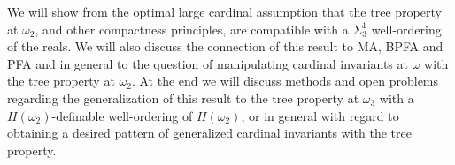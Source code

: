 \documentclass[bsl,meeting]{asl}
\newcommand{\NP}{}
\begin{document}
\thispagestyle{empty}


\NP  
{}


We will show from the optimal large cardinal assumption that the tree property at $\omega_2$, and other compactness principles, are compatible with a $\Sigma^1_3$ well-ordering of the reals. We will also discuss the connection of this result to MA, BPFA and PFA and in general to the question of manipulating cardinal invariants at $\omega$ with the tree property at $\omega_2$. At the end we will discuss methods and open problems regarding the generalization of this result to the tree property at $\omega_3$ with a $H(\omega_2)$-definable well-ordering of $H(\omega_2)$, or in general with regard to obtaining a desired pattern of generalized cardinal invariants with the tree property.
\end{document}
